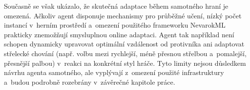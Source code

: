 Současně se však ukázalo, že skutečná adaptace během samotného hraní je omezená. Ačkoliv agent disponuje mechanismy pro průběžné učení, nízký počet instancí v~herním prostředí a~omezení použitého frameworku NevarokML prakticky znemožňují smysluplnou online adaptaci. Agent tak například není schopen dynamicky upravovat optimální vzdálenost od protivníka ani adaptovat střelecké chování (např. volbu mezi rychlejší, méně přesnou střelbou a~pomalejší, přesnější palbou) v~reakci na konkrétní styl hráče. Tyto limity nejsou důsledkem návrhu agenta samotného, ale vyplývají z~omezení použité infrastruktury a~budou podrobně rozebrány v~závěrečné kapitole práce.
